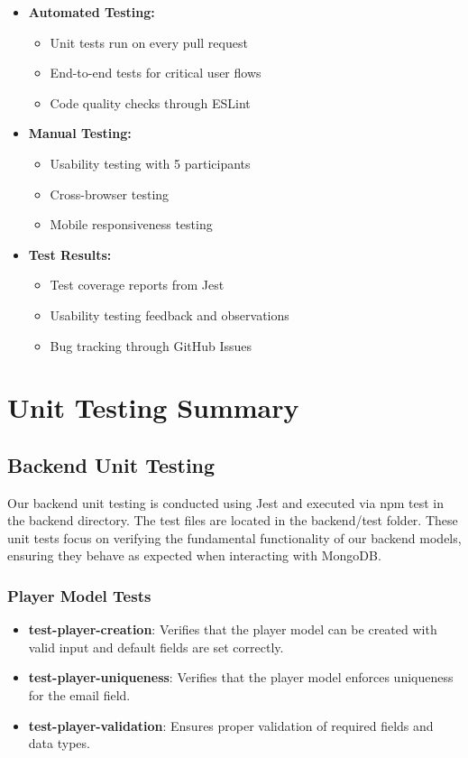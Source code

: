\documentclass[12pt, titlepage]{article}
\begin{document}
\begin{itemize}
    \item \textbf{Automated Testing:}
    \begin{itemize}
        \item Unit tests run on every pull request
        \item End-to-end tests for critical user flows
        \item Code quality checks through ESLint
    \end{itemize}
    
    \item \textbf{Manual Testing:}
    \begin{itemize}
        \item Usability testing with 5 participants
        \item Cross-browser testing
        \item Mobile responsiveness testing
    \end{itemize}
    
    \item \textbf{Test Results:}
    \begin{itemize}
        \item Test coverage reports from Jest
        \item Usability testing feedback and observations
        \item Bug tracking through GitHub Issues
    \end{itemize}
\end{itemize}

\section{Unit Testing Summary}

\subsection{Backend Unit Testing}

Our backend unit testing is conducted using Jest and executed via npm test in the backend directory. The test files are located in the backend/test folder. These unit tests focus on verifying the fundamental functionality of our backend models, ensuring they behave as expected when interacting with MongoDB.

\subsubsection{Player Model Tests}
\begin{itemize}
    \item \textbf{test-player-creation}: Verifies that the player model can be created with valid input and default fields are set correctly.
    \item \textbf{test-player-uniqueness}: Verifies that the player model enforces uniqueness for the email field.
    \item \textbf{test-player-validation}: Ensures proper validation of required fields and data types.
\end{itemize}
\end{document}

